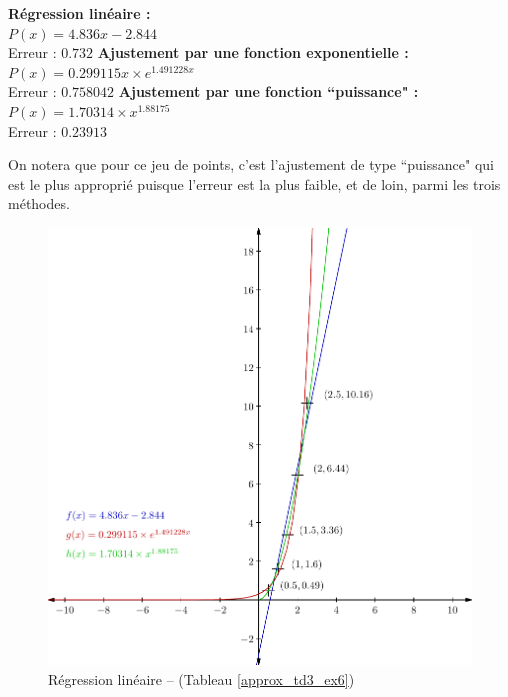 \documentclass{report}
\begin{document}
	\noindent \textbf{Régression linéaire : } \\
	$P(x) = 4.836x - 2.844$\\
	Erreur : $0.732$
	\newline
	\newline
	\textbf{Ajustement par une fonction exponentielle :}\\
	$P(x) = 0.299115x \times e^{1.491228x}$\\
	Erreur : $0.758042$
	\newline
	\newline
	\textbf{Ajustement par une fonction ``puissance" :}\\
	$P(x) = 1.70314\times x^{1.88175}$\\
	Erreur : $0.23913$
	\newline
	
	On notera que pour ce jeu de points, c'est l'ajustement de type ``puissance" qui est le plus approprié puisque l'erreur est la plus faible, et de loin, parmi les trois méthodes.
	\begin{figure}[h]
	  \centering
	  \includegraphics[scale=0.8]{graphiques/pdf_output/reglin.pdf}
	  \caption{Régression linéaire -- (Tableau \ref{approx_td3_ex6})}
	\end{figure}
      \newpage
\end{document}
